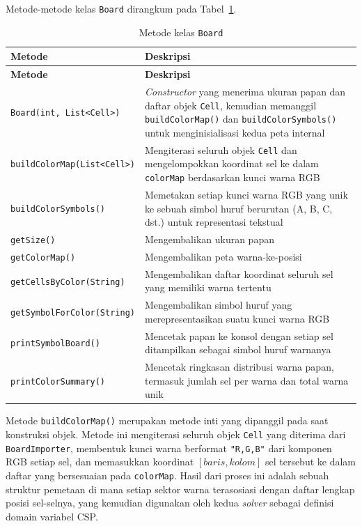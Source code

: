 Metode-metode kelas \texttt{Board} dirangkum pada Tabel~\ref{tab:method-board}.

\begin{longtable}{lp{8.5cm}}
	\caption{Metode kelas \texttt{Board}}
	\label{tab:method-board} \\
	\toprule
	\textbf{Metode} & \textbf{Deskripsi} \\
	\midrule
	\endfirsthead
	\toprule
	\textbf{Metode} & \textbf{Deskripsi} \\
	\midrule
	\endhead
	\bottomrule
	\endfoot
	\texttt{Board(int, List<Cell>)} & \textit{Constructor} yang menerima ukuran papan dan daftar objek \texttt{Cell}, kemudian memanggil \texttt{buildColorMap()} dan \texttt{buildColorSymbols()} untuk menginisialisasi kedua peta internal \\
	\midrule
	\texttt{buildColorMap(List<Cell>)} & Mengiterasi seluruh objek \texttt{Cell} dan mengelompokkan koordinat sel ke dalam \texttt{colorMap} berdasarkan kunci warna RGB \\
	\midrule
	\texttt{buildColorSymbols()} & Memetakan setiap kunci warna RGB yang unik ke sebuah simbol huruf berurutan (A, B, C, dst.) untuk representasi tekstual \\
	\midrule
	\texttt{getSize()} & Mengembalikan ukuran papan \\
	\midrule
	\texttt{getColorMap()} & Mengembalikan peta warna-ke-posisi \\
	\midrule
	\texttt{getCellsByColor(String)} & Mengembalikan daftar koordinat seluruh sel yang memiliki warna tertentu \\
	\midrule
	\texttt{getSymbolForColor(String)} & Mengembalikan simbol huruf yang merepresentasikan suatu kunci warna RGB \\
	\midrule
	\texttt{printSymbolBoard()} & Mencetak papan ke konsol dengan setiap sel ditampilkan sebagai simbol huruf warnanya \\
	\midrule
	\texttt{printColorSummary()} & Mencetak ringkasan distribusi warna papan, termasuk jumlah sel per warna dan total warna unik \\
	\bottomrule
\end{longtable}

Metode \texttt{buildColorMap()} merupakan metode inti yang dipanggil pada saat konstruksi objek. Metode ini mengiterasi seluruh objek \texttt{Cell} yang diterima dari \texttt{BoardImporter}, membentuk kunci warna berformat \texttt{"R,G,B"} dari komponen RGB setiap sel, dan memasukkan koordinat $[\textit{baris}, \textit{kolom}]$ sel tersebut ke dalam daftar yang bersesuaian pada \texttt{colorMap}. Hasil dari proses ini adalah sebuah struktur pemetaan di mana setiap sektor warna terasosiasi dengan daftar lengkap posisi sel-selnya, yang kemudian digunakan oleh kedua \textit{solver} sebagai definisi domain variabel CSP.


